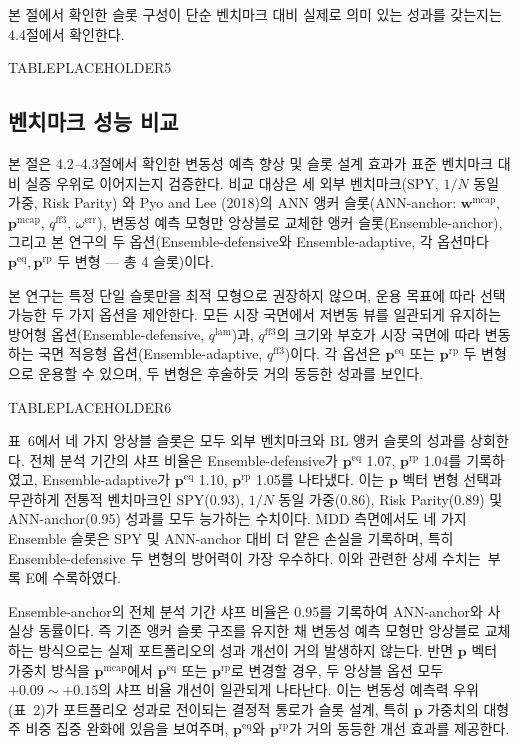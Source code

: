 \documentclass{article}
\begin{document}
본 절에서 확인한 슬롯 구성이 단순 벤치마크 대비 실제로 의미 있는 성과를 갖는지는 4.4절에서 확인한다.



TABLEPLACEHOLDER5



\subsection{벤치마크 성능 비교}\label{subsec:benchmark}

본 절은 4.2--4.3절에서 확인한 변동성 예측 향상 및 슬롯 설계 효과가 표준 벤치마크 대비 실증 우위로 이어지는지 검증한다. 비교 대상은 세 외부 벤치마크(SPY, $1/N$ 동일 가중, Risk Parity) 와 Pyo and Lee (2018)의 ANN 앵커 슬롯(ANN-anchor: $\mathbf{w}^{\mathrm{mcap}}$, $\mathbf{p}^{\mathrm{mcap}}$, $q^{\mathrm{ff3}}$, $\omega^{\mathrm{err}}$), 변동성 예측 모형만 앙상블로 교체한 앵커 슬롯(Ensemble-anchor), 그리고 본 연구의 두 옵션(Ensemble-defensive와 Ensemble-adaptive, 각 옵션마다 $\mathbf{p}^{\mathrm{eq}}, \mathbf{p}^{\mathrm{rp}}$ 두 변형 — 총 4 슬롯)이다.


본 연구는 특정 단일 슬롯만을 최적 모형으로 권장하지 않으며, 운용 목표에 따라 선택 가능한 두 가지 옵션을 제안한다. 모든 시장 국면에서 저변동 뷰를 일관되게 유지하는 방어형 옵션(Ensemble-defensive, $q^{\mathrm{lam}}$)과, $q^{\mathrm{ff3}}$의 크기와 부호가 시장 국면에 따라 변동하는 국면 적응형 옵션(Ensemble-adaptive, $q^{\mathrm{ff3}}$)이다. 각 옵션은 $\mathbf{p}^{\mathrm{eq}}$ 또는 $\mathbf{p}^{\mathrm{rp}}$ 두 변형으로 운용할 수 있으며, 두 변형은 후술하듯 거의 동등한 성과를 보인다.



TABLEPLACEHOLDER6



표~6에서 네 가지 앙상블 슬롯은 모두 외부 벤치마크와 BL 앵커 슬롯의 성과를 상회한다. 전체 분석 기간의 샤프 비율은 Ensemble-defensive가 $\mathbf{p}^{\mathrm{eq}}$ 1.07, $\mathbf{p}^{\mathrm{rp}}$ 1.04를 기록하였고, Ensemble-adaptive가 $\mathbf{p}^{\mathrm{eq}}$ 1.10, $\mathbf{p}^{\mathrm{rp}}$ 1.05를 나타냈다. 이는 $\mathbf{p}$ 벡터 변형 선택과 무관하게 전통적 벤치마크인 SPY(0.93), $1/N$ 동일 가중(0.86), Risk Parity(0.89) 및 ANN-anchor(0.95) 성과를 모두 능가하는 수치이다. MDD 측면에서도 네 가지 Ensemble 슬롯은 SPY 및 ANN-anchor 대비 더 얕은 손실을 기록하며, 특히 Ensemble-defensive 두 변형의 방어력이 가장 우수하다. 이와 관련한 상세 수치는~부록 E에 수록하였다.

Ensemble-anchor의 전체 분석 기간 샤프 비율은 0.95를 기록하여 ANN-anchor와 사실상 동률이다. 즉 기존 앵커 슬롯 구조를 유지한 채 변동성 예측 모형만 앙상블로 교체하는 방식으로는 실제 포트폴리오의 성과 개선이 거의 발생하지 않는다. 반면 $\mathbf{p}$ 벡터 가중치 방식을 $\mathbf{p}^{\mathrm{mcap}}$에서 $\mathbf{p}^{\mathrm{eq}}$ 또는 $\mathbf{p}^{\mathrm{rp}}$로 변경할 경우, 두 앙상블 옵션 모두 $+0.09 \sim +0.15$의 샤프 비율 개선이 일관되게 나타난다. 이는 변동성 예측력 우위(표~2)가 포트폴리오 성과로 전이되는 결정적 통로가 슬롯 설계, 특히 $\mathbf{p}$ 가중치의 대형주 비중 집중 완화에 있음을 보여주며, $\mathbf{p}^{\mathrm{eq}}$와 $\mathbf{p}^{\mathrm{rp}}$가 거의 동등한 개선 효과를 제공한다.
\end{document}
